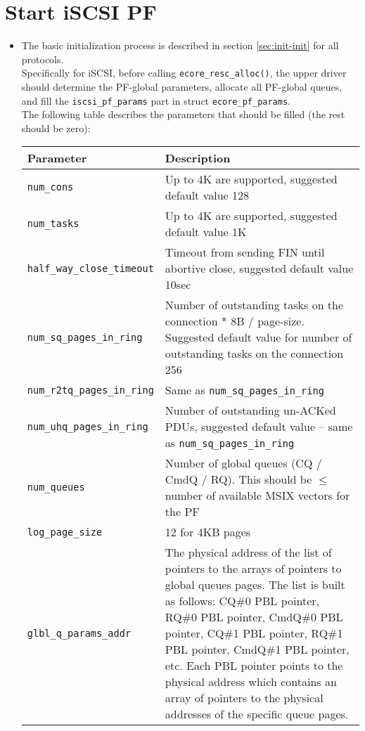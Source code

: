\documentclass[11pt,fleqn,hidelinks,oneside]{book} %
\newcommand{\insertcode}[2]{\begin{itemize}\item[]\end{itemize}} %
\newcommand{\ChapterFuncs}{}
\newcommand{\silentfunc}[1]
{\expandafter\def\expandafter\ChapterFuncs\expandafter{\ChapterFuncs { } \insertcode{snippets/#1_generated.h}{}}}
\begin{document}
\section{Start iSCSI PF}
\silentfunc{sp_iscsi_func_start}
\silentfunc{iscsi_get_global_cmdq_cons}
\begin{itemize}
	\item The basic initialization process is described in section \ref{sec:init-init} for all protocols. \\
	Specifically for iSCSI, before calling \texttt{ecore\_resc\_alloc()}, the upper driver should determine the PF-global parameters, allocate all PF-global queues, and fill the \texttt{iscsi\_pf\_params} part in struct \texttt{ecore\_pf\_params}. \\
	The following table describes the parameters that should be filled (the rest should be zero):
	\begin{center}
		\begin{tabular}{| l | p{10cm} |}
		\hline
		\textbf{Parameter} & \textbf{Description} \\ \hline
		\texttt{num\_cons} & Up to 4K are supported, suggested default value 128 \\ \hline
		\texttt{num\_tasks} & Up to 4K are supported, suggested default value 1K \\ \hline
		\texttt{half\_way\_close\_timeout} & Timeout from sending FIN until abortive close, suggested default value 10sec \\ \hline
		\texttt{num\_sq\_pages\_in\_ring} & Number of outstanding tasks on the connection * 8B / page-size. \newline Suggested default value for number of outstanding tasks on the connection 256 \\ \hline
		\texttt{num\_r2tq\_pages\_in\_ring} & Same as \texttt{num\_sq\_pages\_in\_ring} \\ \hline
		\texttt{num\_uhq\_pages\_in\_ring} & Number of outstanding un-ACKed PDUs, suggested default value -- same as \texttt{num\_sq\_pages\_in\_ring} \\ \hline
		\texttt{num\_queues} & Number of global queues (CQ / CmdQ / RQ). \newline This should be $\leq$ number of available MSIX vectors for the PF \\ \hline
		\texttt{log\_page\_size} & 12 for 4KB pages \\ \hline
		\texttt{glbl\_q\_params\_addr} & The physical address of the list of pointers to the arrays of pointers to global queues pages. \newline The list is built as follows: CQ\#0 PBL pointer, RQ\#0 PBL pointer, CmdQ\#0 PBL pointer, CQ\#1 PBL pointer, RQ\#1 PBL pointer, CmdQ\#1 PBL pointer, etc. \newline Each PBL pointer points to the physical address which contains an array of pointers to the physical addresses of the specific queue pages. \\ \hline

\end{tabular}
\end{center}
\end{itemize}
\end{document}
